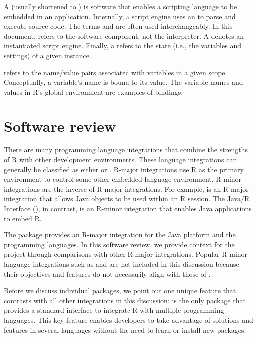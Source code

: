 A  (usually shortened to ) is software that enables a scripting language to be embedded in an application. Internally, a script engine uses an  to parse and execute source code. The terms  and  are often used interchangeably. In this document,  refers to the software component, not the interpreter. A  denotes an instantiated script engine. Finally, a  refers to the state (i.e., the variables and settings) of a given instance.

 refers to the name/value pairs associated with variables in a given scope. Conceptually, a variable's name is bound to its value. The variable names and values in R's global environment are examples of bindings.

\hypertarget{softwarereview}{\section{Software review}}

There are many programming language integrations that combine the strengths of R with other development environments. These language integrations can generally be classified as either  or . R-major integrations use R as the primary environment to control some other embedded language environment. R-minor integrations are the inverse of R-major integrations. For example,  is an R-major integration that allows Java objects to be used within an R session. The Java/R Interface (), in contrast, is an R-minor integration that enables Java applications to embed R.

The  package provides an R-major integration for the Java platform and the  programming languages. In this software review, we provide context for the  project through comparisons with other R-major integrations. Popular R-minor language integrations such as  \citep{rserve} and  \citep{opencpu} are not included in this discussion because their objectives and features do not necessarily align with those of .

Before we discuss individual packages, we point out one unique feature that contrasts  with all other integrations in this discussion:  is the only package that provides a standard interface to integrate R with multiple programming languages. This key feature enables developers to take advantage of solutions and features in several languages without the need to learn or install new packages.

